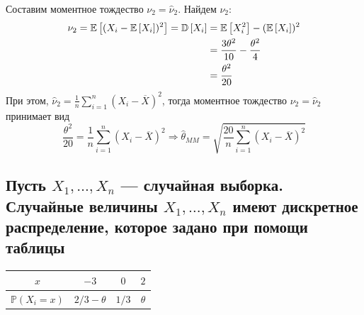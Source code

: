 \documentclass{article}
\begin{document}
Составим моментное тождество $\nu_2=\widehat{\nu}_2$. Найдем $\nu_2$:
\begin{equation*}
    \begin{aligned}
        \nu_2=\mathbb{E}\left[(X_i-\mathbb{E}\left[X_i\right])^2\right]=\mathbb{D}\left[X_i\right]&=\mathbb{E}\left[X_i^2\right]-(\mathbb{E}\left[X_i\right])^2\\
        &=\frac{3\theta^2}{10}-\frac{\theta^2}{4}\\
        &=\frac{\theta^2}{20}
    \end{aligned}
\end{equation*}
При этом, $\widehat{\nu}_2=\frac{1}{n}\sum_{i=1}^{n}(X_i-\overline{X})^2$, тогда моментное тождество $\nu_2=\widehat{\nu}_2$ принимает вид
\begin{equation*}
    \frac{\theta^2}{20}=\frac{1}{n}\sum_{i=1}^{n}(X_i-\overline{X})^2\Longrightarrow\widehat{\theta}_{MM}=\sqrt{\frac{20}{n}\sum_{i=1}^n(X_i-\overline{X})^2}
\end{equation*}



\subsection{Пусть $X_{1}, \ldots, X_{n}$ — случайная выборка. Случайные величины $X_{1}, \ldots, X_{n}$ имеют дискретное распределение, которое задано при помощи таблицы}
\begin{center}
    \begin{tabular}{cccc}
        \hline$x$ & $-3$ & $0$ & $2$ \\
        \hline $\mathbb{P}\left(X_{i}=x\right)$ & $2 / 3-\theta$ & $1 / 3$ & $\theta$ \\
        \hline
    \end{tabular}
\end{center}
\end{document}
